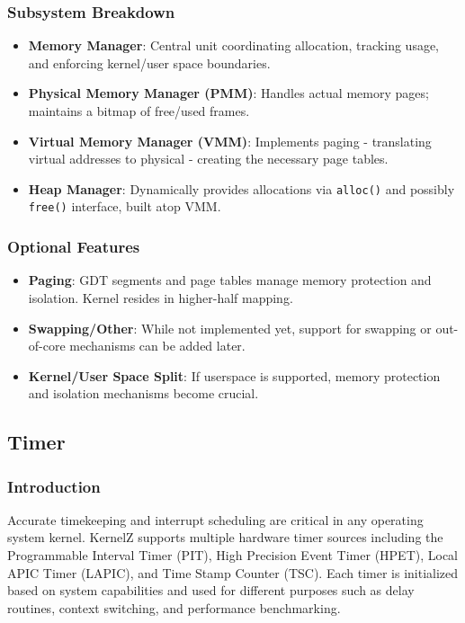 \documentclass[12pt]{extarticle}
\begin{document}
\subsubsection*{Subsystem Breakdown}

\begin{itemize}
    \item \textbf{Memory Manager}: Central unit coordinating allocation, tracking usage, and enforcing kernel/user space boundaries.
    \item \textbf{Physical Memory Manager (PMM)}: Handles actual memory pages; maintains a bitmap of free/used frames.
    \item \textbf{Virtual Memory Manager (VMM)}: Implements paging - translating virtual addresses to physical - creating the necessary page tables.
    \item \textbf{Heap Manager}: Dynamically provides allocations via \texttt{alloc()} and possibly \texttt{free()} interface, built atop VMM.
\end{itemize}

\subsubsection*{Optional Features}

\begin{itemize}
    \item \textbf{Paging}: GDT segments and page tables manage memory protection and isolation. Kernel resides in higher-half mapping.
    \item \textbf{Swapping/Other}: While not implemented yet, support for swapping or out-of-core mechanisms can be added later.
    \item \textbf{Kernel/User Space Split}: If userspace is supported, memory protection and isolation mechanisms become crucial.
\end{itemize}
\pagebreak


\subsection{Timer}

\subsubsection*{Introduction}

Accurate timekeeping and interrupt scheduling are critical in any operating system kernel. KernelZ supports multiple hardware timer sources including the Programmable Interval Timer (PIT), High Precision Event Timer (HPET), Local APIC Timer (LAPIC), and Time Stamp Counter (TSC). Each timer is initialized based on system capabilities and used for different purposes such as delay routines, context switching, and performance benchmarking.
\end{document}
